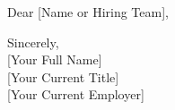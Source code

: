 \documentclass[11pt,a4paper,roman]{moderncv}
\begin{document}
\date{\today}
\opening{Dear [Name or Hiring Team],}
\makelettertitle

\begin{justify}



\end{justify}

\vspace{0.3cm}
{Sincerely,\\
{[Your Full Name]}\\
{[Your Current Title]}\\
{[Your Current Employer]}}
\end{document}
